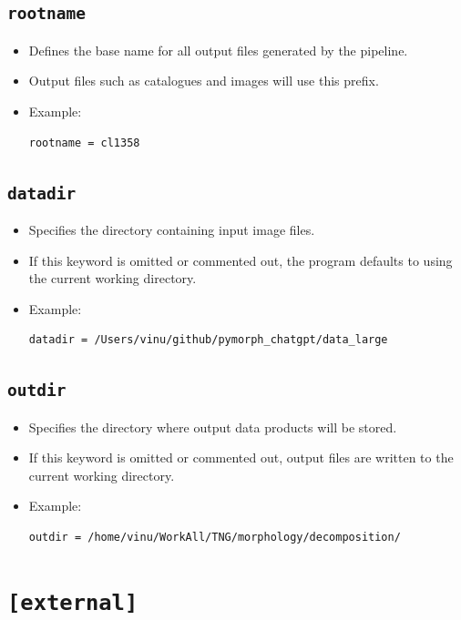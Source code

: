 \documentclass[11pt]{article}
\begin{document}
\subsection{\texttt{rootname}}
\begin{itemize}
\item Defines the base name for all output files generated by the pipeline.
\item Output files such as catalogues and images will use this prefix.
\item Example:
\begin{verbatim}
rootname = cl1358
\end{verbatim}
\end{itemize}


\subsection{\texttt{datadir}}
\begin{itemize}
\item Specifies the directory containing input image files.
\item If this keyword is omitted or commented out, the program defaults to using the current working directory.
\item Example:
\begin{verbatim}
datadir = /Users/vinu/github/pymorph_chatgpt/data_large
\end{verbatim}
\end{itemize}

\subsection{\texttt{outdir}}
\begin{itemize}
\item Specifies the directory where output data products will be stored.
\item If this keyword is omitted or commented out, output files are written to the current working directory.
\item Example:
\begin{verbatim}
outdir = /home/vinu/WorkAll/TNG/morphology/decomposition/
\end{verbatim}
\end{itemize}

\section{\texttt{[external]}}
\end{document}
